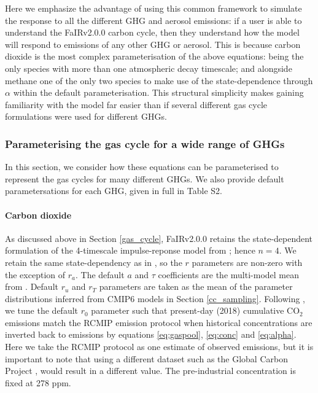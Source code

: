 \documentclass[gmd, manuscript]{copernicus}
\begin{document}
%
Here we emphasize the advantage of using this common framework to simulate the response to all the different GHG and aerosol emissions: if a user is able to understand the FaIRv2.0.0 carbon cycle, then they understand how the model will respond to emissions of any other GHG or aerosol. This is because carbon dioxide is the most complex parameterisation of the above equations: being the only species with more than one atmospheric decay timescale; and alongside methane one of the only two species to make use of the state-dependence through $\alpha$ within the default parameterisation. This structural simplicity makes gaining familiarity with the model far easier than if several different gas cycle formulations were used for different GHGs.
%
\subsubsection{Parameterising the gas cycle for a wide range of GHGs} \label{gas_cycle_parameters}
In this section, we consider how these equations can be parameterised to represent the gas cycles for many different GHGs. We also provide default parametersations for each GHG, given in full in Table S2.
\paragraph*{Carbon dioxide}
As discussed above in Section \ref{gas_cycle}, FaIRv2.0.0 retains the state-dependent formulation \citep{Millar2016} of the 4-timescale impulse-reponse model from \citet{Joos2013}; hence $n=4$. We retain the same state-dependency as in \citet{Millar2016}, so the $r$ parameters are non-zero with the exception of $r_a$. The default $a$ and $\tau$ coefficients are the multi-model mean from \citet{Joos2013}. Default $r_u$ and $r_T$ parameters are taken as the mean of the parameter distributions inferred from CMIP6 models in Section \ref{cc_sampling}. Following \citet{Jenkins2018}, we tune the default $r_0$ parameter such that present-day (2018) cumulative CO$_2$ emissions match the RCMIP emission protocol \citep{Nicholls2019} when historical concentrations \citep{Meinshausen2017} are inverted back to emissions by equations \ref{eq:gaspool}, \ref{eq:conc} and \ref{eq:alpha}. Here we take the RCMIP protocol as one estimate of observed emissions, but it is important to note that using a different dataset such as the Global Carbon Project \citep{Friedlingstein2019}, would result in a different value. The pre-industrial concentration is fixed at 278 ppm.
\end{document}
